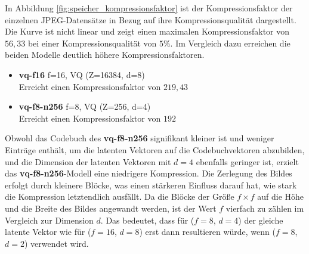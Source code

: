             In Abbildung \ref{fig:speicher_kompressionsfaktor} ist der Kompressionsfaktor der einzelnen
            JPEG-Datensätze in Bezug auf ihre Kompressionsqualität dargestellt. Die Kurve ist nicht linear und zeigt einen maximalen Kompressionsfaktor von $56,33$ bei einer Kompressionsqualität von $5\%$.
            Im Vergleich dazu erreichen die beiden Modelle deutlich höhere Kompressionsfaktoren.
            \begin{itemize}
                \item \textbf{vq-f16} f=16, VQ (Z=16384, d=8)\\
                    Erreicht einen Kompressionsfaktor von $219,43$
                \item \textbf{vq-f8-n256} f=8, VQ (Z=256, d=4)\\
                     Erreicht einen Kompressionsfaktor von $192$
            \end{itemize}
            Obwohl das Codebuch des \textbf{vq-f8-n256} signifikant kleiner ist und weniger Einträge enthält, um die latenten Vektoren auf die Codebuchvektoren abzubilden, und die Dimension der latenten Vektoren mit $d = 4$ ebenfalls geringer ist, erzielt das \textbf{vq-f8-n256}-Modell eine niedrigere Kompression.
            Die Zerlegung des Bildes erfolgt durch kleinere Blöcke, was einen stärkeren Einfluss darauf hat, wie stark die Kompression letztendlich ausfällt. Da die Blöcke der Größe $f \times f$ auf die Höhe und die Breite des Bildes angewandt werden, ist der Wert $f$ vierfach zu zählen im Vergleich zur Dimension $d$.
            Das bedeutet, dass für ($f = 8$, $d=4$) der gleiche latente Vektor wie für ($f=16$, $d=8$) erst dann resultieren würde, wenn ($f=8$, $d=2$) verwendet wird.

